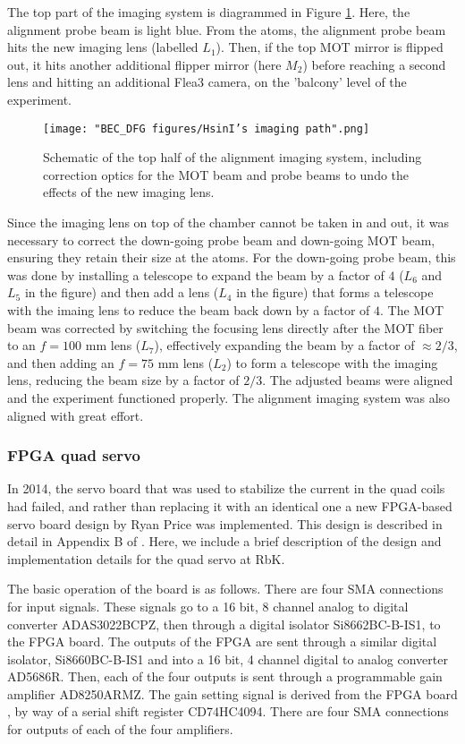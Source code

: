 The top part of the imaging system is diagrammed in Figure \ref{fig:HsinIsImaging}. Here, the alignment probe beam is light blue. From the atoms, the alignment probe beam hits the new imaging lens (labelled $L_1$). Then, if the top MOT mirror is flipped out, it hits another additional flipper mirror (here $M_2$) before reaching a second lens and hitting an additional Flea3 camera, on the 'balcony' level of the experiment. 
\begin{figure}
	\texttt{[image: "BEC\_DFG figures/HsinI's imaging path".png]}
\caption[Schematic of the top half of the alignment imaging system]{Schematic of the top half of the alignment imaging system, including correction optics for the MOT beam and probe beams to undo the effects of the new imaging lens.}
\label{fig:HsinIsImaging}
\end{figure}
Since the imaging lens on top of the chamber cannot be taken in and out, it was necessary to correct the down-going probe beam and down-going MOT beam, ensuring they retain their size at the atoms. For the down-going probe beam, this was done by installing a telescope to expand the beam by a factor of $4$ ($L_6$ and $L_5$ in the figure) and then add a lens ($L_4$ in the figure) that forms a telescope with the imaing lens to reduce the beam back down by a factor of $4$. The MOT beam was corrected by switching the focusing lens directly after the MOT fiber to an $f=100$ mm lens ($L_7$), effectively expanding the beam by a factor of $\approx2/3$, and then adding an $f=75$ mm lens ($L_2$) to form a telescope with the imaging lens, reducing the beam size by a factor of $2/3$. The adjusted beams were aligned and the experiment functioned properly. The alignment imaging system was also aligned with great effort.

\subsubsection{FPGA quad servo}
In 2014, the servo board that was used to stabilize the current in the quad coils had failed, and rather than replacing it with an identical one a new FPGA-based servo board design by Ryan Price was implemented. This design is described in detail in Appendix B of \cite{PriceThesis}. Here, we include a brief description of the design and implementation details for the quad servo at RbK.

The basic operation of the board is as follows. There are four SMA connections for input signals. These signals go to a 16 bit, 8 channel analog to digital converter ADAS3022BCPZ, then through a digital isolator Si8662BC-B-IS1, to the FPGA board. The outputs of the FPGA are sent through a similar digital isolator, Si8660BC-B-IS1 and into a 16 bit, 4 channel digital to analog converter AD5686R. Then, each of the four outputs is sent through a programmable gain amplifier AD8250ARMZ. The gain setting signal is derived from the FPGA board , by way of a serial shift register  CD74HC4094. There are four SMA connections for outputs of each of the four amplifiers.  

